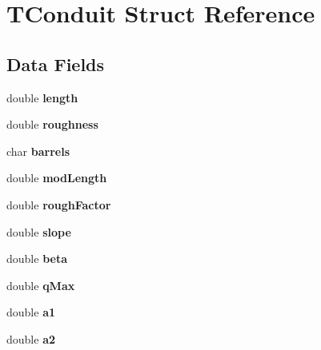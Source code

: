 \hypertarget{struct_t_conduit}{}\section{T\+Conduit Struct Reference}
\label{struct_t_conduit}
\subsection*{Data Fields}
\begin{DoxyCompactItemize}
\item 
\mbox{\label{struct_t_conduit_a928b11f5716331f0b89abe7d8d4124b4}} 
double {\bfseries length}
\item 
\mbox{\label{struct_t_conduit_aae6a29bf1aea8336238154d7b4b95994}} 
double {\bfseries roughness}
\item 
\mbox{\label{struct_t_conduit_a5351dba49fccef4e077ac38599b87bc9}} 
char {\bfseries barrels}
\item 
\mbox{\label{struct_t_conduit_aeb0b07435e58d73f40ce137d63845cda}} 
double {\bfseries mod\+Length}
\item 
\mbox{\label{struct_t_conduit_a65c0d1cf2d56fa2d93f2691e2b1470c0}} 
double {\bfseries rough\+Factor}
\item 
\mbox{\label{struct_t_conduit_a723974ead8c85a6b9c70c6e018cb64c1}} 
double {\bfseries slope}
\item 
\mbox{\label{struct_t_conduit_a9424343761f8c4f4c1afe8f5b6bf471b}} 
double {\bfseries beta}
\item 
\mbox{\label{struct_t_conduit_a1e9074679d06c29cfa780c9773f82861}} 
double {\bfseries q\+Max}
\item 
\mbox{\label{struct_t_conduit_a5d015a3751aec61f2442b957cb6f517a}} 
double {\bfseries a1}
\item 
\mbox{\label{struct_t_conduit_ac55c2d269ed76bd9bdb7fb25f3533a4e}} 
double {\bfseries a2}
\item 

\end{DoxyCompactItemize}
